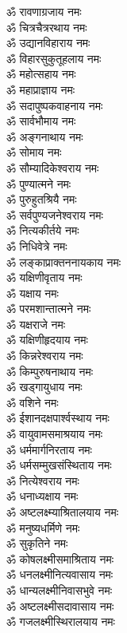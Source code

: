 \begin{multicols}{2}
\begin{flushleft}
ॐ रावणाग्रजाय नमः\hfill{}\\ %
ॐ चित्रचैत्ररथाय नमः\\
ॐ उद्यानविहाराय नमः\\
ॐ विहारसुकुतूहलाय नमः\\
ॐ महोत्सहाय नमः\\
ॐ महाप्राज्ञाय नमः\\
ॐ सदापुष्पकवाहनाय नमः\\
ॐ सार्वभौमाय नमः\\
ॐ अङ्गनाथाय नमः\\
ॐ सोमाय नमः\\
ॐ सौम्यादिकेश्वराय नमः\hfill{}\\ %
ॐ पुण्यात्मने नमः\\
ॐ पुरुहुतश्रियै नमः\\
ॐ सर्वपुण्यजनेश्वराय नमः\\
ॐ नित्यकीर्तये नमः\\
ॐ निधिवेत्रे नमः\\
ॐ लङ्काप्राक्तननायकाय नमः\\
ॐ यक्षिणीवृताय नमः\\
ॐ यक्षाय नमः\\
ॐ परमशान्तात्मने नमः\\
ॐ यक्षराजे नमः\hfill{}\\ %
ॐ यक्षिणीहृदयाय नमः\\ 
ॐ किन्नरेश्वराय नमः\\
ॐ किम्पुरुषनाथाय नमः\\
ॐ खड्गायुधाय नमः\\
ॐ वशिने नमः\\
ॐ ईशानदक्षपार्श्वस्थाय नमः\\
ॐ वायुवामसमाश्रयाय नमः\\
ॐ धर्ममार्गनिरताय नमः\\
ॐ धर्मसम्मुखसंस्थिताय नमः\\
ॐ नित्येश्वराय नमः\hfill{}\\ %
ॐ धनाध्यक्षाय नमः\\
ॐ अष्टलक्ष्म्याश्रितालयाय नमः\\
ॐ मनुष्यधर्मिणे नमः\\
ॐ सुकृतिने नमः\\
ॐ कोषलक्ष्मीसमाश्रिताय नमः\\
ॐ धनलक्ष्मीनित्यवासाय नमः\\
ॐ धान्यलक्ष्मीनिवासभुवे नमः\\
ॐ अष्टलक्ष्मीसदावासाय नमः\\
ॐ गजलक्ष्मीस्थिरालयाय नमः\\

\end{flushleft}
\end{multicols}
